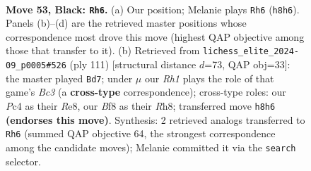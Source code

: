 \documentclass[11pt]{article}
\begin{document}
\begin{figure}[p]\centering
\begin{subfigure}{0.46\textwidth}\centering
\resizebox{\linewidth}{!}{%
\newchessgame
\chessboard[
  setfen={2rk1b1r/6p1/p1p5/Pp1b1p1p/2p2P1P/2B1P1P1/1P5N/1RK3R1 b - - 8 53},
  showmover=false,
  pgfstyle=straightmove, color=movearrow, markmove={h8-h6}
]}
\caption{}
\end{subfigure}\hfill
\begin{subfigure}{0.46\textwidth}\centering
\resizebox{\linewidth}{!}{%
\newchessgame
\chessboard[
  setfen={4r2r/2k2p2/2b1p1p1/1p1pP2p/pP3P2/P1P1R1P1/2KRB2P/8 b - - 52 56},
  showmover=false,
  pgfstyle=straightmove, color=movearrow, markmove={c6-d7}
]}
\caption{}
\end{subfigure}
\\[4pt]

\caption{\textbf{Move 53, Black: \texttt{Rh6}.} (a) Our position; Melanie plays \texttt{Rh6} (\texttt{h8h6}). Panels (b)--(d) are the retrieved master positions whose correspondence most drove this move (highest QAP objective among those that transfer to it). (b) Retrieved from \texttt{lichess\_elite\_2024-09\_p0005\#526} (ply 111) [structural distance $d$=73, QAP obj=33]: the master played \texttt{Bd7}; under $\mu$ our \emph{Rh1} plays the role of that game's \emph{Bc3} (a \textbf{cross-type} correspondence); cross-type roles: our \emph{P}c4 as their \emph{R}e8, our \emph{B}f8 as their \emph{R}h8; transferred move \texttt{h8h6} \textbf{(endorses this move)}. Synthesis: 2 retrieved analogs transferred to \texttt{Rh6} (summed QAP objective 64, the strongest correspondence among the candidate moves); Melanie committed it via the \texttt{search} selector.}
\label{fig:thought-m105}
\end{figure}

\clearpage
\end{document}
